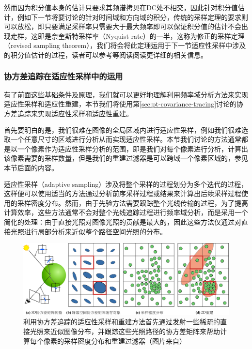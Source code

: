 然而因为积分值本身的估计只要求其频谱拷贝在DC处不相交，因此针对积分值估计，例如下一节将要讨论的针对时间域和方向域的积分，传统的采样定理的要求则可以放松，即只要满足采样率只需要大于最大频率即可以保证积分值的估计不会出现走样，这即是奈奎斯特采样率（Nyquist rate）的一半，这称为修正的采样定理（revised sampling theorem），我们将会将此定理运用于下一节适应性采样中涉及的积分值估计的过程，读者可以参考\cite{a:AFrequencyAnalysisofMonteCarloandotherNumericalIntegrationSchemes,a:5DCovarianceTracingforEfficientDefocusandMotionBlur}等阅读阅读更详细的相关信息。





\subsubsection{协方差追踪在适应性采样中的运用}
有了前面这些基础条件及原理，我们就可以更好地理解利用频率域分析方法来实现适应性采样和适应性重建，本节我们将使用第\ref{sec:pt-covariance-tracing}讨论的协方差追踪来实现适应性采样和适应性重建。

首先要明白的是，我们很难在图像的全局区域内进行适应性采样，例如我们很难选取一个任意尺寸的区域进行分析从而实现适应性采样。本节我们讨论的方法通常都是以一个像素作为适应性采样分析的范围，即是我们对每个像素进行分析，计算出该像素需要的采样数量，但是我们的重建过滤器是可以跨域一个像素区域的，参见本节后面的内容。

适应性采样（adaptive sampling）涉及将整个采样的过程划分为多个迭代的过程，这样便可以使用适当的方法通过分析前序采样过程或结果来计算出后续采样过程使用的采样密度分布。然而，由于先验方法需要跟踪整个光线传输的过程，为了提高计算效率，这些方法通常不会对整个光线追踪过程进行频率域分析，而是采用一个简化的处理：由于直接光照对图像光照的贡献是最大的，因此这些方法仅通过对直接光照进行局部分析来近似整个路径空间光照的分布。

\begin{figure}
\begin{fullwidth}
	\includegraphics[width=1.\thewidth]{figures/pt/adaptive-sampling}
	\caption{利用协方差追踪的适应性采样和重建方法首先通过发射一些稀疏的直接光照来近似图像分布，并跟踪这些光照路径的协方差矩阵来帮助计算每个像素的采样密度分布和重建过滤器（图片来自\cite{a:5DCovarianceTracingforEfficientDefocusandMotionBlur}）}
	\label{f:pt-adaptive-sampling}
\end{fullwidth}
\end{figure}

